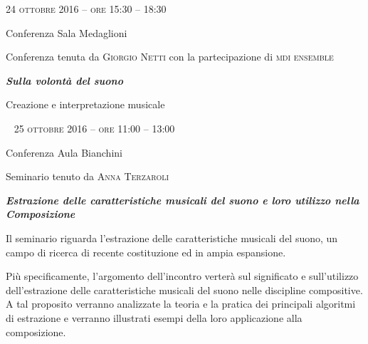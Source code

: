 
\begin{flushright}

\large{
	\scshape{
	24 ottobre 2016 -- ore 15:30 -- 18:30
	}}

\medskip
	
\small{Conferenza
	\newline Sala Medaglioni}

\medskip

{\fontsize{42}{42} }

\normalfont

\normalsize

\bigskip

Conferenza tenuta da \textsc{Giorgio Netti} con la partecipazione di \textsc{mdi ensemble}

\bigskip

\textbf{\emph{Sulla volontà del suono}}

Creazione e interpretazione musicale


%
%

~\vfill
\large{
	\scshape{
	25 ottobre 2016 -- ore 11:00 -- 13:00
	}}

\medskip
	
\small{Conferenza
	\newline Aula Bianchini}

\medskip

{\fontsize{42}{42} }

\normalfont

\normalsize

\bigskip

Seminario tenuto da \textsc{Anna Terzaroli}

\bigskip

\textbf{\emph{Estrazione delle caratteristiche musicali del suono e loro utilizzo nella Composizione}}

Il seminario riguarda l'estrazione delle caratteristiche musicali del suono, un campo di ricerca di recente costituzione ed in ampia espansione. 

Più specificamente, l'argomento dell'incontro verterà sul significato e sull'utilizzo dell'estrazione delle caratteristiche musicali del suono nelle discipline compositive. A tal proposito verranno analizzate la teoria e la pratica dei principali algoritmi di estrazione e verranno illustrati esempi della loro applicazione alla composizione.

\end{flushright}

\vfill